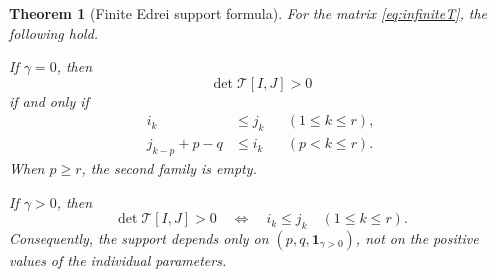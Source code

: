 \documentclass{amsart}
\numberwithin{equation}{section}
\newtheorem{theorem}{Theorem}
\theoremstyle{definition}
\theoremstyle{remark}
\begin{document}
\begin{theorem}[Finite Edrei support formula]\label{thm:Edrei-support}
For the matrix \eqref{eq:infiniteT}, the following hold.

If $\gamma=0$, then
\begin{equation}\label{eq:Edrei-positive}
 \det\mathcal T[I,J]>0
\end{equation}
if and only if
\begin{align}
 i_k&\le j_k &&(1\le k\le r),\label{eq:structural}\\
 j_{k-p}+p-q&\le i_k &&(p<k\le r).\label{eq:hookineq}
\end{align}
When $p\ge r$, the second family is empty.

If $\gamma>0$, then
\begin{equation}\label{eq:gamma-positive}
 \det\mathcal T[I,J]>0
 \quad\Longleftrightarrow\quad
 i_k\le j_k\quad(1\le k\le r).
\end{equation}
Consequently, the support depends only on $(p,q,\mathbf 1_{\gamma>0})$, not on the positive values of the individual parameters.
\end{theorem}
\end{document}
